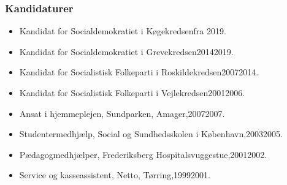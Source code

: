 \documentclass[11pt, a4paper]{awesome-cv}
\begin{document}
\begin{cvletter}
\subsubsection*{Kandidaturer}
\begin{itemize}
\item Kandidat for Socialdemokratiet i Køgekredsenfra 2019.
\item Kandidat for Socialdemokratiet i Grevekredsen20142019.
\item Kandidat for Socialistisk Folkeparti i Roskildekredsen20072014.
\item Kandidat for Socialistisk Folkeparti i Vejlekredsen20012006.
\end{itemize}
\begin{itemize}
\item Ansat i hjemmeplejen, Sundparken, Amager,20072007.
\item Studentermedhjælp, Social og Sundhedsskolen i København,20032005.
\item Pædagogmedhjælper, Frederiksberg Hospitalsvuggestue,20012002.
\item Service og kasseassistent, Netto, Tørring,19992001.
\end{itemize}
\end{cvletter}
\end{document}

